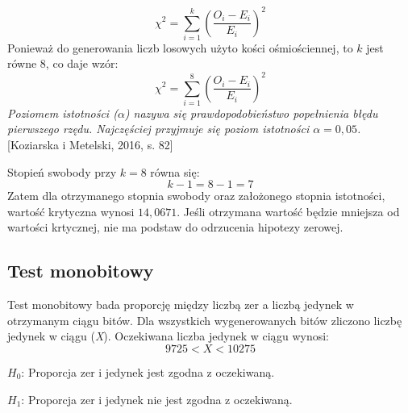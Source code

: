 \begin{displaymath}
    \chi^2 = \sum_{i=1}^{k} \left( \frac{O_i - E_i}{E_i} \right)^2
\end{displaymath}
Ponieważ do generowania liczb losowych użyto kości ośmiościennej, to \begin{math} k \end{math} jest równe 8, co daje wzór:
\begin{displaymath}
    \chi^2 = \sum^{8}_{i=1} \left( \frac{O_i - E_i}{E_i} \right)^2
\end{displaymath}
\textit{Poziomem istotności (\begin{math} \alpha \end{math}) nazywa się prawdopodobieństwo popełnienia błędu pierwszego 
rzędu. Najczęściej przyjmuje się poziom istotności \begin{math} \alpha = 0{,}05\end{math}.} 
[Koziarska i Metelski, 2016, s. 82]
\par Stopień swobody przy \begin{math} k = 8 \end{math} równa się:
\begin{displaymath}
    k - 1 = 8 - 1 = 7
\end{displaymath}
Zatem dla otrzymanego stopnia swobody oraz założonego stopnia istotności, wartość krytyczna wynosi \begin{math} 
14{,}0671 \end{math}. Jeśli otrzymana wartość będzie mniejsza od wartości krtycznej, nie ma podstaw do odrzucenia 
hipotezy zerowej.


\subsection{Test monobitowy}
Test monobitowy bada proporcję między liczbą zer a liczbą jedynek w otrzymanym ciągu bitów. Dla wszystkich 
wygenerowanych bitów zliczono liczbę jedynek w ciągu (\textit{X}). Oczekiwana liczba jedynek w ciągu wynosi:
\begin{displaymath}
    9725 < X < 10275
\end{displaymath}
\par \begin{math} H_0 \end{math}: Proporcja zer i jedynek jest zgodna z oczekiwaną.
\par \begin{math} H_1 \end{math}: Proporcja zer i jedynek nie jest zgodna z oczekiwaną.

